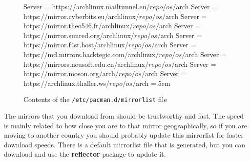 \documentclass{article}
\theoremstyle{definition}
\newenvironment{cverbatim}
    {\SaveVerbatim{cverb}}
    {\endSaveVerbatim
    \flushleft\fboxrule=0pt\fboxsep=.5em
    \colorbox{cverbbg}{%
      \makebox[\dimexpr\linewidth-2\fboxsep][l]{\BUseVerbatim{cverb}}%
    }
    \endflushleft
  }
\begin{document}
    \begin{figure}
      \begin{cverbatim}
        Server = https://archlinux.mailtunnel.eu/$repo/os/$arch
        Server = https://mirror.cyberbits.eu/archlinux/$repo/os/$arch
        Server = https://mirror.theo546.fr/archlinux/$repo/os/$arch
        Server = https://mirror.sunred.org/archlinux/$repo/os/$arch
        Server = https://mirror.f4st.host/archlinux/$repo/os/$arch
        Server = https://md.mirrors.hacktegic.com/archlinux/$repo/os/$arch
        Server = https://mirrors.neusoft.edu.cn/archlinux/$repo/os/$arch
        Server = https://mirror.moson.org/arch/$repo/os/$arch
        Server = https://archlinux.thaller.ws/$repo/os/$arch
      \end{cverbatim}
      \caption{Contents of the \texttt{/etc/pacman.d/mirrorlist} file}\label{fig:mirrorlist}
    \end{figure}
    
    The mirrors that you download from should be trustworthy and fast. The speed is mainly related to how close you are to that mirror geographically, so if you are moving to another country you should probably update this mirrorlist for faster download speeds. There is a default mirrorlist file that is generated, but you can download and use the \textbf{reflector} package to update it.  
\end{document}
